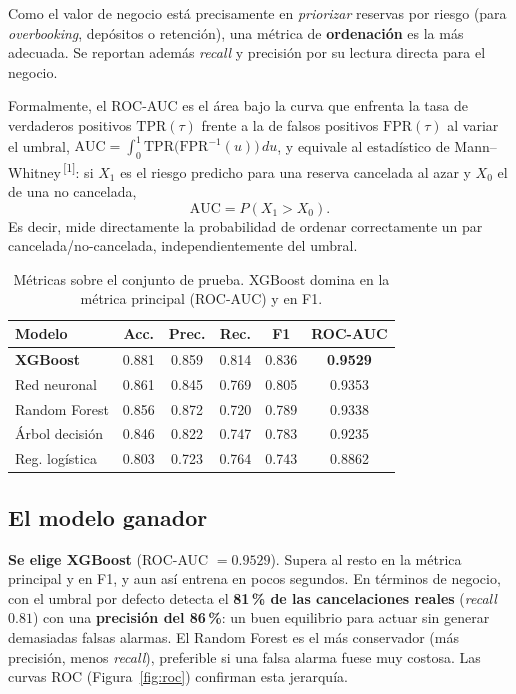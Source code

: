 \documentclass[10pt,twocolumn,a4paper]{article}
\begin{document}
Como el valor de negocio está precisamente en \emph{priorizar} reservas por riesgo
(para \emph{overbooking}, depósitos o retención), una métrica de \textbf{ordenación}
es la más adecuada. Se reportan además \emph{recall} y precisión por su lectura
directa para el negocio.

Formalmente, el ROC-AUC es el área bajo la curva que enfrenta la tasa de verdaderos
positivos $\mathrm{TPR}(\tau)$ frente a la de falsos positivos $\mathrm{FPR}(\tau)$ al
variar el umbral, $\mathrm{AUC} = \int_0^1 \mathrm{TPR}\bigl(\mathrm{FPR}^{-1}(u)\bigr)\,du$,
y equivale al estadístico de Mann--Whitney\,\textsuperscript{[1]}: si $X_1$ es el riesgo
predicho para una reserva cancelada al azar y $X_0$ el de una no cancelada,
\begin{equation}
\mathrm{AUC} = P(X_1 > X_0).
\end{equation}
Es decir, mide directamente la probabilidad de ordenar correctamente un par
cancelada/no-cancelada, independientemente del umbral.

\begin{table}[t]
  \centering
  \small
  \setlength{\tabcolsep}{4pt}
  \renewcommand{\arraystretch}{1.2}
  \begin{tabular}{@{}lccccc@{}}
    \toprule
    \textbf{Modelo} & Acc. & Prec. & Rec. & F1 & \textbf{ROC-AUC} \\
    \midrule
    \textbf{XGBoost} & 0.881 & 0.859 & 0.814 & 0.836 & \textbf{0.9529} \\
    Red neuronal     & 0.861 & 0.845 & 0.769 & 0.805 & 0.9353 \\
    Random Forest    & 0.856 & 0.872 & 0.720 & 0.789 & 0.9338 \\
    Árbol decisión   & 0.846 & 0.822 & 0.747 & 0.783 & 0.9235 \\
    Reg. logística   & 0.803 & 0.723 & 0.764 & 0.743 & 0.8862 \\
    \bottomrule
  \end{tabular}
  \caption{Métricas sobre el conjunto de prueba. XGBoost domina en la métrica
  principal (ROC-AUC) y en F1.}
  \label{tab:resultados}
\end{table}

\subsection{El modelo ganador}

\textbf{Se elige XGBoost} (ROC-AUC $=0.9529$). Supera al resto en la métrica principal
y en F1, y aun así entrena en pocos segundos. En términos de negocio, con el umbral
por defecto detecta el \textbf{81\,\% de las cancelaciones reales} (\emph{recall}
$0.81$) con una \textbf{precisión del 86\,\%}: un buen equilibrio para actuar sin
generar demasiadas falsas alarmas. El Random Forest es el más conservador (más
precisión, menos \emph{recall}), preferible si una falsa alarma fuese muy costosa. Las
curvas ROC (Figura~\ref{fig:roc}) confirman esta jerarquía.
\end{document}
